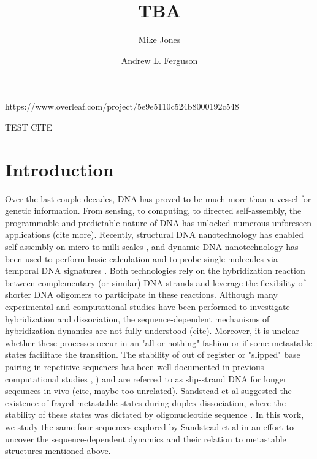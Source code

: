 \documentclass[journal=jpcbfk,manuscript=article]{achemso}
\author{Mike Jones}
\affiliation{%
  Pritzker School of Molecular Engineering, %
  University of Chicago, %
  Chicago, Illinois 60637%
}
\author{Andrew L. Ferguson}
\affiliation{%
  Pritzker School of Molecular Engineering, %
  University of Chicago, %
  Chicago, Illinois 60637%
}
\title[]{TBA}
\begin{document}

\newpage

\begin{abstract}

\noindent 

\end{abstract}
https://www.overleaf.com/project/5e9e5110c524b8000192c548

\newpage

TEST CITE \cite{Phys2014}

\section{\label{sec:intro}Introduction}

Over the last couple decades, DNA has proved to be much more than a vessel for genetic information. From sensing, to computing, to directed self-assembly, the programmable and predictable nature of DNA has unlocked numerous unforeseen applications \citep{Seeman2017DNANanotechnology} (cite more). Recently, structural DNA nanotechnology has enabled self-assembly on micro to milli scales \citep{MhatreV.HoJi-AnnLee2012NIHAccess}, and dynamic DNA nanotechnology has been used to perform basic calculation \citep{Bui2018} and to probe single molecules via temporal DNA signatures \citep{Shah2019}. Both technologies rely on the hybridization reaction between complementary (or similar) DNA strands and leverage the flexibility of shorter DNA oligomers to participate in these reactions. Although many experimental and computational studies have been performed to investigate hybridization and dissociation, the sequence-dependent mechanisms of hybridization dynamics are not fully understood (cite). Moreover, it is unclear whether these processes occur in an "all-or-nothing" fashion or if some metastable states facilitate the transition. The stability of out of register or "slipped" base pairing in repetitive sequences has been well documented in previous computational studies \citep{Phys2014}, \citep{Xiao2019}) and are referred to as slip-strand DNA for longer seqeunces in vivo (cite, maybe too unrelated). Sandstead et al suggested the existence of frayed metastable states during duplex dissociation, where the stability of these states was dictated by oligonucleotide sequence \citep{Sanstead2016}. In this work, we study the same four sequences explored by Sandstead et al in an effort to uncover the sequence-dependent dynamics and their relation to  metastable structures mentioned above.
\end{document}
